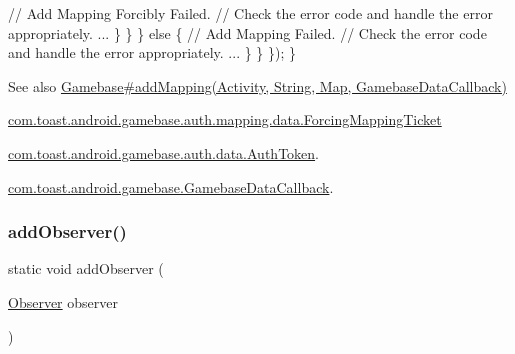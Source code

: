 \begin{DoxyCode}
                        \textcolor{comment}{// Add Mapping Forcibly Failed.}
                        \textcolor{comment}{// Check the error code and handle the error appropriately.}
                        ...
                    \}
                \}
            \} \textcolor{keywordflow}{else} \{
                \textcolor{comment}{// Add Mapping Failed.}
                \textcolor{comment}{// Check the error code and handle the error appropriately.}
                ...
            \}
        \}
    \});
\}
\end{DoxyCode}


\begin{DoxySeeAlso}{See also}
\hyperlink{}{Gamebase\#add\+Mapping(\+Activity, String, Map, Gamebase\+Data\+Callback)} 

\hyperlink{classcom_1_1toast_1_1android_1_1gamebase_1_1auth_1_1mapping_1_1data_1_1_forcing_mapping_ticket}{com.\+toast.\+android.\+gamebase.\+auth.\+mapping.\+data.\+Forcing\+Mapping\+Ticket} 

\hyperlink{classcom_1_1toast_1_1android_1_1gamebase_1_1auth_1_1data_1_1_auth_token}{com.\+toast.\+android.\+gamebase.\+auth.\+data.\+Auth\+Token}. 

\hyperlink{interfacecom_1_1toast_1_1android_1_1gamebase_1_1_gamebase_data_callback}{com.\+toast.\+android.\+gamebase.\+Gamebase\+Data\+Callback}. 
\end{DoxySeeAlso}
\mbox{\label{classcom_1_1toast_1_1android_1_1gamebase_1_1_gamebase_a9079ec835df5660d8b19a1fd3eb0d9d8}} 
\subsubsection{\texorpdfstring{add\+Observer()}{addObserver()}}
{\footnotesize\ttfamily static void add\+Observer (\begin{DoxyParamCaption}\item[{\hyperlink{interfacecom_1_1toast_1_1android_1_1gamebase_1_1observer_1_1_observer}{Observer}}]{observer }\end{DoxyParamCaption})\hspace{0.3cm}{\ttfamily [static]}}



